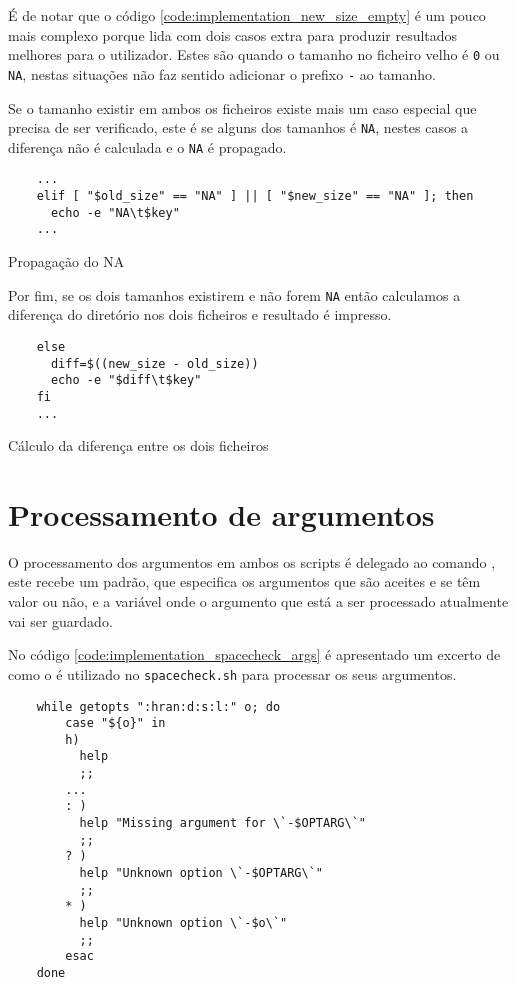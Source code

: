 É de notar que o código \ref{code:implementation_new_size_empty} é um pouco mais
complexo porque lida com dois casos extra para produzir resultados melhores para
o utilizador. Estes são quando o tamanho no ficheiro velho é \Verb|0| ou
\Verb|NA|, nestas situações não faz sentido adicionar o prefixo \Verb|-| ao
tamanho.

Se o tamanho existir em ambos os ficheiros existe mais um caso especial que
precisa de ser verificado, este é se alguns dos tamanhos é \Verb|NA|, nestes
casos a diferença não é calculada e o \Verb|NA| é propagado.

\begin{listing}[H]
	\centering
	\begin{verbatim}
    ...
    elif [ "$old_size" == "NA" ] || [ "$new_size" == "NA" ]; then
      echo -e "NA\t$key"
    ...
  \end{verbatim}
	\caption{Propagação do NA}
\end{listing}

Por fim, se os dois tamanhos existirem e não forem \Verb|NA| então calculamos a
diferença do diretório nos dois ficheiros e resultado é impresso.

\begin{listing}[H]
	\centering
	\begin{verbatim}
    else
      diff=$((new_size - old_size))
      echo -e "$diff\t$key"
    fi
    ...
  \end{verbatim}
	\caption{Cálculo da diferença entre os dois ficheiros}
\end{listing}

\section{Processamento de argumentos}\label{sec:implementation_arg_parsing}

O processamento dos argumentos em ambos os scripts é delegado ao comando
, este recebe um padrão, que especifica os argumentos que são
aceites e se têm valor ou não, e a variável onde o argumento que está a ser
processado atualmente vai ser guardado.

No código \ref{code:implementation_spacecheck_args} é apresentado um excerto de
como o  é utilizado no \Verb|spacecheck.sh| para processar
os seus argumentos.

\begin{listing}[H]
	\centering
	\begin{verbatim}
    while getopts ":hran:d:s:l:" o; do
        case "${o}" in
        h)
          help
          ;;
        ...
        : )
          help "Missing argument for \`-$OPTARG\`"
          ;;
        ? )
          help "Unknown option \`-$OPTARG\`"
          ;;
        * )
          help "Unknown option \`-$o\`"
          ;;
        esac
    done
  \end{verbatim}
	\cprotect\caption{Processamento de argumentos no \Verb|spacecheck.sh|}
	\label{code:implementation_spacecheck_args}
\end{listing}

